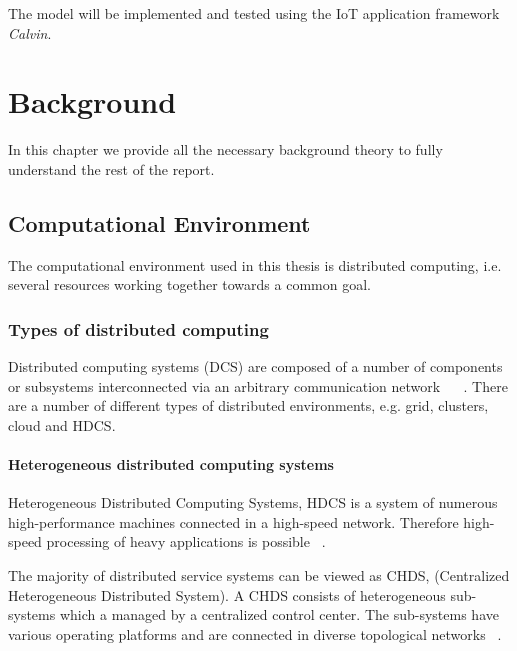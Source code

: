 \documentclass{cslthse-msc}
\begin{document}
The model will be implemented and tested using the IoT application framework \emph{Calvin}.

\chapter{Background} \label{ch:background}
In this chapter we provide all the necessary background theory to fully understand the rest of the report.
\section{Computational Environment} \label{sec:background_comp_env}
The computational environment used in this thesis is distributed computing, i.e. several resources working together towards a common goal.
\subsection{Types of distributed computing} \label{subsec:background_types_of_distr_comp}
Distributed computing systems (DCS) are composed of a number of components or subsystems interconnected via an arbitrary communication network ~\cite{relModelDistSimSystem} ~\cite{efficientRelAnalysisAlgo}. There are a number of different types of distributed environments, e.g. grid, clusters, cloud and HDCS.

\subsubsection{Heterogeneous distributed computing systems}
Heterogeneous Distributed Computing Systems, HDCS is a system of numerous high-performance machines connected in a high-speed network. Therefore high-speed processing of heavy applications is possible ~\cite{algoMinExTime}. %

The majority of distributed service systems can be viewed as CHDS, (Centralized Heterogeneous Distributed System). A CHDS consists of heterogeneous sub-systems which a managed by a centralized control center. The sub-systems have various operating platforms and are connected in diverse topological networks ~\cite{studyServiceRel}.

\end{document}
